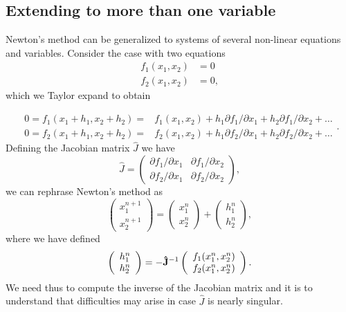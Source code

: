 \documentclass[%
oneside,                 %
final,                   %
10pt]{article}
\begin{document}
\subsection*{Extending to more than one variable}

Newton's method can be generalized to systems of several non-linear equations
and variables. Consider the case with two equations
\[
   \begin{array}{cc} f_1(x_1,x_2) &=0\\
                     f_2(x_1,x_2) &=0,\end{array}
\]
which we Taylor expand to obtain

\[
   \begin{array}{cc} 0=f_1(x_1+h_1,x_2+h_2)=&f_1(x_1,x_2)+h_1
                     \partial f_1/\partial x_1+h_2
                     \partial f_1/\partial x_2+\dots\\
                     0=f_2(x_1+h_1,x_2+h_2)=&f_2(x_1,x_2)+h_1
                     \partial f_2/\partial x_1+h_2
                     \partial f_2/\partial x_2+\dots
                       \end{array}.
\]
Defining the Jacobian matrix $\hat{J}$ we have
\[
 \hat{J}=\left( \begin{array}{cc}
                         \partial f_1/\partial x_1  & \partial f_1/\partial x_2 \\
                          \partial f_2/\partial x_1     &\partial f_2/\partial x_2
             \end{array} \right),
\]
we can rephrase Newton's method as
\[
\left(\begin{array}{c} x_1^{n+1} \\ x_2^{n+1} \end{array} \right)=
\left(\begin{array}{c} x_1^{n} \\ x_2^{n} \end{array} \right)+
\left(\begin{array}{c} h_1^{n} \\ h_2^{n} \end{array} \right),
\]
where we have defined
\[
   \left(\begin{array}{c} h_1^{n} \\ h_2^{n} \end{array} \right)=
   -{\bf \hat{J}}^{-1}
   \left(\begin{array}{c} f_1(x_1^{n},x_2^{n}) \\ f_2(x_1^{n},x_2^{n}) \end{array} \right).
\]
We need thus to compute the inverse of the Jacobian matrix and it
is to understand that difficulties  may
arise in case $\hat{J}$ is nearly singular.
\end{document}
